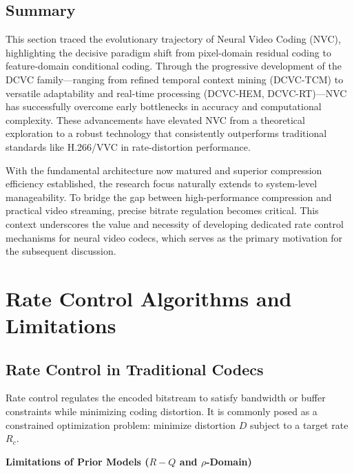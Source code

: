 \subsection{Summary}

This section traced the evolutionary trajectory of Neural Video Coding (NVC), highlighting the decisive paradigm shift from pixel-domain residual coding to feature-domain conditional coding. Through the progressive development of the DCVC family—ranging from refined temporal context mining (DCVC-TCM) to versatile adaptability and real-time processing (DCVC-HEM, DCVC-RT)—NVC has successfully overcome early bottlenecks in accuracy and computational complexity. These advancements have elevated NVC from a theoretical exploration to a robust technology that consistently outperforms traditional standards like H.266/VVC in rate-distortion performance.

With the fundamental architecture now matured and superior compression efficiency established, the research focus naturally extends to system-level manageability. To bridge the gap between high-performance compression and practical video streaming, precise bitrate regulation becomes critical. This context underscores the value and necessity of developing dedicated rate control mechanisms for neural video codecs, which serves as the primary motivation for the subsequent discussion.












\section{Rate Control Algorithms and Limitations}

\subsection{Rate Control in Traditional Codecs}

Rate control regulates the encoded bitstream to satisfy bandwidth or buffer constraints while minimizing coding distortion. It is commonly posed as a constrained optimization problem: minimize distortion $D$ subject to a target rate $R_c$.

\noindent \textbf{Limitations of Prior Models (\boldmath$R\!-\!Q$ and \boldmath$\rho$-Domain)}

